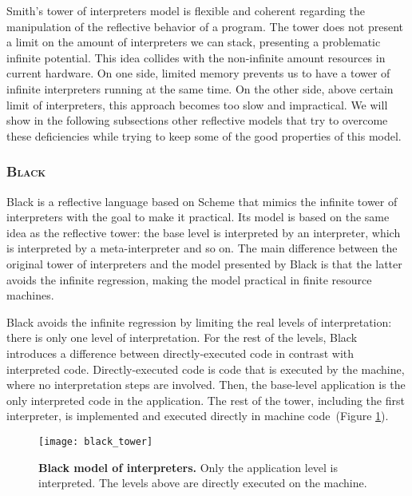 Smith's tower of interpreters model is flexible and coherent regarding the manipulation of the reflective behavior of a program. The tower does not present a limit on the amount of interpreters we can stack, presenting a problematic infinite potential. This idea collides with the non-infinite amount resources in current hardware. On one side, limited memory prevents us to have a tower of infinite interpreters running at the same time. On the other side, above certain limit of interpreters, this approach becomes too slow and impractical. We will show in the following subsections other reflective models that try to overcome these deficiencies while trying to keep some of the good properties of this model.

\subsubsection*{\textsc{Black}}

Black is a reflective language based on Scheme that mimics the infinite tower of interpreters with the goal to make it practical. Its model is based on the same idea as the reflective tower: the base level is interpreted by an interpreter, which is interpreted by a meta-interpreter and so on. The main difference between the original tower of interpreters and the model presented by Black is that the latter avoids the infinite regression, making the model practical in finite resource machines.

Black avoids the infinite regression by limiting the real levels of interpretation: there is only one level of interpretation. For the rest of the levels, Black  introduces a difference between directly-executed code in contrast with interpreted code. Directly-executed code is code that is executed by the machine, where no interpretation steps are involved. Then, the base-level application is the only interpreted code in the application. The rest of the tower, including the first interpreter, is implemented and executed directly in machine code~(Figure \ref{fig:black_tower}).

\begin{figure}[ht]
\begin{center}
\texttt{[image: black\_tower]}
\caption{\textbf{Black model of interpreters.} Only the application level is interpreted. The levels above are directly executed on the machine.\label{fig:black_tower}
 }
\end{center}
\end{figure}


